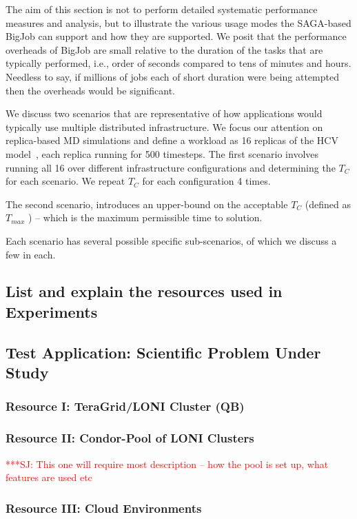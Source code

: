\documentclass[conference,final]{IEEEtran}
\newcommand{\numrep}{16 }
\newcommand{\samplenum}{4 }
\newcommand{\tmax}{$T_{max}$ }
\newcommand{\tc}{$T_{C}$ }
\newcommand{\jhanote}[1]{ {\textcolor{red} { ***SJ: #1 }}}
\newcommand{\jhanote}[1]{}
\begin{document}
The aim of this section is not to perform detailed systematic
performance measures and analysis, but to illustrate the various usage
modes the SAGA-based BigJob can support and how they are supported. We
posit that the performance overheads of BigJob are small relative to
the duration of the tasks that are typically performed, i.e., order of
seconds compared to tens of minutes and hours.  Needless to say, if
millions of jobs each of short duration were being attempted then the
overheads would be significant.

We discuss two scenarios that are representative of how applications
would typically use multiple distributed infrastructure. We focus our
attention on replica-based MD simulations and define a workload as
\numrep replicas of the HCV model~\cite{}, each replica running for
500 timesteps.  The first scenario involves running all \numrep over
different infrastructure configurations and determining the \tc for
each scenario. We repeat \tc for each configuration \samplenum times.

The second scenario, introduces an upper-bound on the acceptable \tc
(defined as \tmax) -- which is the maximum permissible time to
solution.

Each scenario has several possible specific sub-scenarios, of which we
discuss a few in each.

\subsection{List and explain the resources used in Experiments}

\subsection{Test Application: Scientific Problem Under Study}

\subsubsection*{Resource I: TeraGrid/LONI Cluster (QB)}

\subsubsection*{Resource II: Condor-Pool of LONI Clusters}

\jhanote{This one will require most description -- how the pool is set
up, what features are used etc}

\subsubsection*{Resource III: Cloud Environments}
\end{document}
